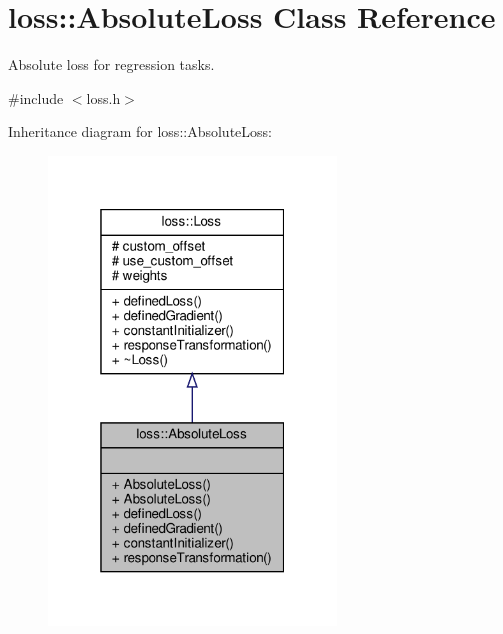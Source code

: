 \hypertarget{classloss_1_1_absolute_loss}{}\section{loss\+:\+:Absolute\+Loss Class Reference}
\label{classloss_1_1_absolute_loss}


Absolute loss for regression tasks.  




{\ttfamily \#include $<$loss.\+h$>$}



Inheritance diagram for loss\+:\+:Absolute\+Loss\+:\nopagebreak
\begin{figure}[H]
\begin{center}
\leavevmode
\includegraphics[width=217pt]{classloss_1_1_absolute_loss__inherit__graph}
\end{center}
\end{figure}


